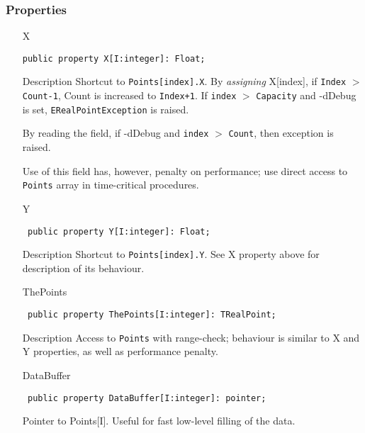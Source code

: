 \documentclass[12pt,a4paper,oneside]{report}
\newcommand{\declarationitem}[1]{{\addfontfeatures{FakeBold=1.3} #1}}
\newcommand{\descriptiontitle}[1]{{\addfontfeatures{FakeSlant}#1}}
\newcommand{\code}[1]{\texttt{#1}}
\begin{document}
\subsubsection{Properties}
\begin{itemize}
	\item[\declarationitem{X}\hfill]
	\begin{flushleft}
		\code{public property X[I:integer]: Float;}
	\end{flushleft}
	\item[\descriptiontitle{Description}]
	Shortcut to \code{Points[index].X}. By \textit{assigning} X[index], if  \code{Index} $>$ \code{Count-1}, Count is increased to \code{Index+1}. If \code{index} $>$ \code{Capacity} and -dDebug is set, \code{ERealPointException} is raised. 
	
	By reading the field, if -dDebug and \code{index} $>$ \code{Count}, then exception is raised.
	
	Use of this field has, however, penalty on performance; use direct access to \code{Points} array in time-critical procedures. 
	\par  \label{lmPointsVec.TPoints-Y}
	\item[\declarationitem{Y}\hfill]
	\begin{flushleft}
		\code{
			public property Y[I:integer]: Float;}
	\end{flushleft}
	\item[\descriptiontitle{Description}]
	Shortcut to \code{Points[index].Y}. See X property above for description of its behaviour. 
	\par  \label{lmPointsVec.TPoints-ThePoints}
	\item[\declarationitem{ThePoints}\hfill]
	\begin{flushleft}
		\code{
			public property ThePoints[I:integer]: TRealPoint;}
	\end{flushleft}
	\item[\descriptiontitle{Description}]
	Access to \code{Points} with range-check; behaviour is similar to X and Y properties, as well as performance penalty.
	\par  \label{lmPointsVec.TPoints-DataBuffer}
	\item[\declarationitem{DataBuffer}\hfill]
	\begin{flushleft}
		\code{
			public property DataBuffer[I:integer]: pointer;}
	\end{flushleft}
	Pointer to Points[I]. Useful for fast low-level filling of the data.
\end{itemize}
	
\end{document}
